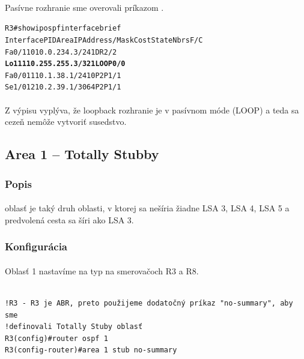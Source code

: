 \documentclass[12pt,twoside,a4paper]{report}
\begin{document}
\paragraph{}
Pasívne rozhranie sme overovali príkazom .

\noindent
{\selectfont
\begin{small}
\begin{alltt}

R3#show ip ospf interface brief
Interface    PID   Area            IP Address/Mask    Cost  State Nbrs F/C
Fa0/1        1     0               10.0.234.3/24      1     DR    2/2
\textbf{Lo1          1     1               10.255.255.3/32    1     LOOP  0/0}
Fa0/0        1     1               10.1.38.1/24       10    P2P   1/1
Se1/0        1     2               10.2.39.1/30       64    P2P   1/1

\end{alltt}
\end{small}
}

\paragraph{}
Z výpisu vyplýva, že loopback rozhranie  je v pasívnom móde (LOOP) a teda sa cezeň nemôže vytvoriť susedstvo.

\subsection{Area 1 – Totally Stubby}
\subsubsection{Popis}
\paragraph{}
 oblasť je taký druh oblasti, v ktorej sa nešíria žiadne LSA 3, LSA 4, LSA 5 a predvolená cesta sa šíri ako LSA 3.

\subsubsection{Konfigurácia}
\paragraph{}
Oblasť 1 nastavíme na typ  na smerovačoch R3 a R8.

\noindent
{\selectfont
\begin{small}
\begin{verbatim}

!R3 - R3 je ABR, preto použijeme dodatočný príkaz "no-summary", aby sme 
!definovali Totally Stuby oblasť
R3(config)#router ospf 1
R3(config-router)#area 1 stub no-summary

\end{verbatim}
\end{small}
}
\end{document}
